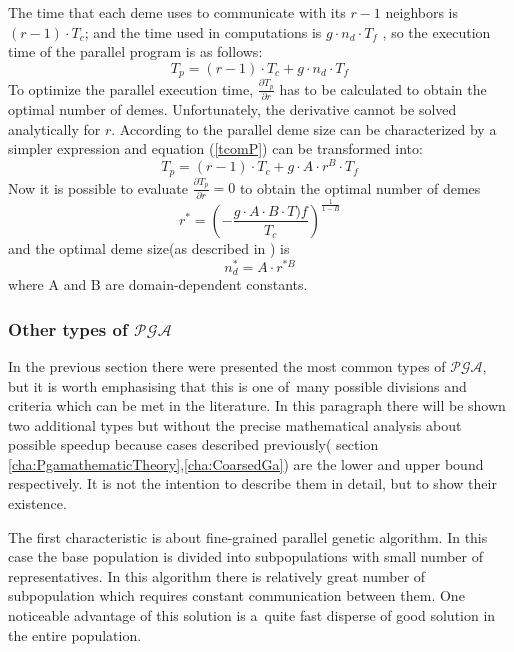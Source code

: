 The time that each deme uses to communicate with its $r-1$ neighbors is
$(r-1)\cdot T_c$; and the time used in computations is $g\cdot n_d\cdot T_f$ ,
so the execution time of the parallel program is as follows:
\begin{equation}
	T_p=(r-1)\cdot T_c+g\cdot n_d\cdot T_f
	\label{tcomP}
\end{equation}
To optimize the parallel execution time, $\frac{\partial T_p}{\partial r}$ has to be
calculated to obtain the optimal number of demes. Unfortunately, the derivative
cannot be solved analytically for $r$. According to \cite{bib21} the parallel
deme size can be characterized by a simpler expression and equation
(\ref{tcomP}) can be transformed into:
\begin{equation}
	T_p=(r-1)\cdot T_c+g\cdot A\cdot r ^B \cdot T_f
	\label{tcomP2}
\end{equation}
Now it is possible to evaluate $\frac{\partial T_p}{\partial r}=0$ to obtain the
optimal number of demes 
\begin{equation}
	r^*=(-\frac{g\cdot A\cdot B\cdot T)f}{T_c})^{\frac{1}{1-B}}
	\label{rOptimal}
\end{equation}
and the optimal deme size(as described in \cite{bib21}) is 
\begin{equation}
	n^*_d=A\cdot r^{*B}
	\label{ndOptimal}
\end{equation}
where A and B are domain-dependent constants.

\subsubsection{Other types of $\mathcal{PGA}$}
In the previous section there were presented the most common types of
$\mathcal{PGA}$, but it is worth emphasising that this is one of~many possible
divisions and criteria which can be met in the literature. In this paragraph
there will be shown two additional types but without the precise mathematical
analysis about possible speedup because cases described previously( section
\ref{cha:PgamathematicTheory},\ref{cha:CoarsedGa}) are the lower
and upper bound respectively. It is not the intention to describe them in
detail, but to show their existence. 

The first characteristic is about fine-grained parallel genetic algorithm. In
this case the base population is divided into subpopulations with small number
of representatives. In this algorithm there is relatively great number of
subpopulation which requires constant communication between them. One noticeable
advantage of this solution is a~quite fast disperse of good solution in the entire
population. 

